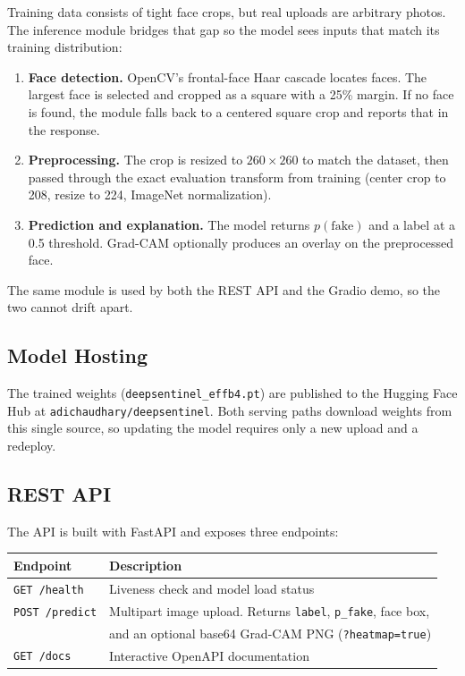 \documentclass[11pt]{article}
\begin{document}
Training data consists of tight face crops, but real uploads are arbitrary photos. The inference module bridges that gap so the model sees inputs that match its training distribution:
\begin{enumerate}
  \item \textbf{Face detection.} OpenCV's frontal-face Haar cascade \cite{opencv} locates faces. The largest face is selected and cropped as a square with a 25\% margin. If no face is found, the module falls back to a centered square crop and reports that in the response.
  \item \textbf{Preprocessing.} The crop is resized to $260\times260$ to match the dataset, then passed through the exact evaluation transform from training (center crop to 208, resize to 224, ImageNet normalization).
  \item \textbf{Prediction and explanation.} The model returns $p(\text{fake})$ and a label at a 0.5 threshold. Grad-CAM optionally produces an overlay on the preprocessed face.
\end{enumerate}
The same module is used by both the REST API and the Gradio demo, so the two cannot drift apart.

\subsection{Model Hosting}

The trained weights (\texttt{deepsentinel\_effb4.pt}) are published to the Hugging Face Hub at \texttt{adichaudhary/deepsentinel}. Both serving paths download weights from this single source, so updating the model requires only a new upload and a redeploy.

\subsection{REST API}

The API is built with FastAPI and exposes three endpoints:

\begin{table}[h]
\centering
\begin{tabular}{ll}
\toprule
Endpoint & Description \\
\midrule
\texttt{GET /health} & Liveness check and model load status \\
\texttt{POST /predict} & Multipart image upload. Returns \texttt{label}, \texttt{p\_fake}, face box, \\
                       & and an optional base64 Grad-CAM PNG (\texttt{?heatmap=true}) \\
\texttt{GET /docs} & Interactive OpenAPI documentation \\
\bottomrule
\end{tabular}
\end{table}
\end{document}
